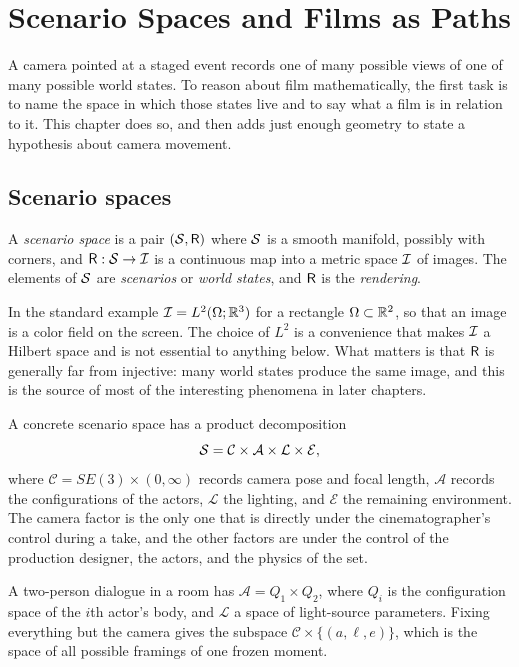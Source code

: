 \chapter{Scenario Spaces and Films as Paths}
\label{ch:scenario}

A camera pointed at a staged event records one of many possible views of one of many possible world states. To reason about film mathematically, the first task is to name the space in which those states live and to say what a film is in relation to it. This chapter does so, and then adds just enough geometry to state a hypothesis about camera movement.

\section{Scenario spaces}

\begin{definition}
A \emph{scenario space} is a pair $(\mathcal{S},\mathsf{R})$ where $\mathcal{S}$ is a smooth manifold, possibly with corners, and $\mathsf{R}:\mathcal{S}\to\mathcal{I}$ is a continuous map into a metric space $\mathcal{I}$ of images. The elements of $\mathcal{S}$ are \emph{scenarios} or \emph{world states}, and $\mathsf{R}$ is the \emph{rendering}.
\end{definition}

In the standard example $\mathcal{I}=L^2(\Omega;\mathbb{R}^3)$ for a rectangle $\Omega\subset\mathbb{R}^2$, so that an image is a color field on the screen. The choice of $L^2$ is a convenience that makes $\mathcal{I}$ a Hilbert space and is not essential to anything below. What matters is that $\mathsf{R}$ is generally far from injective: many world states produce the same image, and this is the source of most of the interesting phenomena in later chapters.

A concrete scenario space has a product decomposition
\[
\mathcal{S}=\mathcal{C}\times\mathcal{A}\times\mathcal{L}\times\mathcal{E},
\]
where $\mathcal{C}=SE(3)\times(0,\infty)$ records camera pose and focal length, $\mathcal{A}$ records the configurations of the actors, $\mathcal{L}$ the lighting, and $\mathcal{E}$ the remaining environment. The camera factor is the only one that is directly under the cinematographer's control during a take, and the other factors are under the control of the production designer, the actors, and the physics of the set.

\begin{example}
A two-person dialogue in a room has $\mathcal{A}=Q_1\times Q_2$, where $Q_i$ is the configuration space of the $i$th actor's body, and $\mathcal{L}$ a space of light-source parameters. Fixing everything but the camera gives the subspace $\mathcal{C}\times\{(a,\ell,e)\}$, which is the space of all possible framings of one frozen moment.
\end{example}

